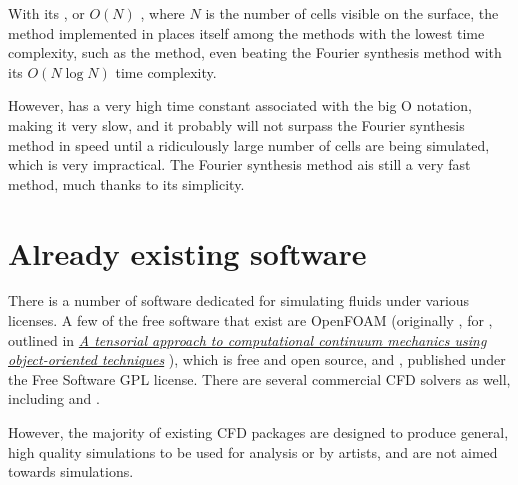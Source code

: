 With its , or $O(N)$ , where $N$ is the number of cells visible on the surface, the method implemented in \thisprojectwork places itself among the methods with the lowest time complexity, such as the \LPD method, even beating the Fourier synthesis method with its $O(N \log N)$ time complexity.

However, \thismethod has a very high time constant associated with the big O notation, making it very slow, and it probably will not surpass the Fourier synthesis method in speed until a ridiculously large number of cells are being simulated, which is very impractical. The Fourier synthesis method ais still a very fast method, much thanks to its simplicity.

\section{Already existing software}

There is a number of software dedicated for simulating fluids under various licenses. A few of the free software  that exist are OpenFOAM (originally , for \textit{}, outlined in \textit{\href{http://powerlab.fsb.hr/ped/kturbo/openfoam/docs/foam.pdf}{A tensorial approach to computational continuum mechanics using object-oriented techniques}} \citep{temp}), which is free and open source, and \Gerris \citep{temp}, published under the Free Software GPL license. There are several commercial CFD solvers as well, including \RealFlow and . %

However, the majority of existing CFD packages are designed to produce general, high quality simulations to be used for analysis or by artists, and are not aimed towards \realtime simulations.